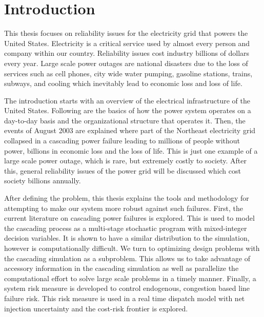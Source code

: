 \newcommand{\mypath}{../thesis}
\newcommand{\mypathintro}{../thesis/intro}
\chapter{Introduction}\label{intro-chapter}
This thesis focuses on reliability issues for the electricity grid that powers the United States.  Electricity is a critical service used by almost every person and company within our country.  Reliability issues cost industry billions of dollars every year.  Large scale power outages are national disasters due to the loss of services such as cell phones, city wide water pumping, gasoline stations, trains, subways, and cooling which inevitably lead to economic loss and loss of life.  

The introduction starts with an overview of the electrical infrastructure of the United States.  Following are the basics of how the power system operates on a day-to-day basis and the organizational structure that operates it. Then, the events of August 2003 are explained where part of the Northeast electricity grid collapsed in a cascading power failure leading to millions of people without power, billions in economic loss and the loss of life.  This is just one example of a large scale power outage, which is rare, but extremely costly to society. After this, general reliability issues of the power grid will be discussed which cost society billions annually.
 
After defining the problem, this thesis explains the tools and methodology for attempting to make our system more robust against such failures.  First, the current literature on cascading power failures is explored.  This is used to model the cascading process as a multi-stage stochastic program with mixed-integer decision variables.  It is shown to have a similar distribution to the simulation, however is computationally difficult.  We turn to optimizing design problems with the cascading simulation as a subproblem.  This allows us to take advantage of accessory information in the cascading simulation as well as parallelize the computational effort to solve large scale problems in  a timely manner.  Finally, a system risk measure is developed to control endogenous, congestion based line failure risk.  This risk measure is used in a real time dispatch model with net injection uncertainty and the cost-risk frontier is explored.


